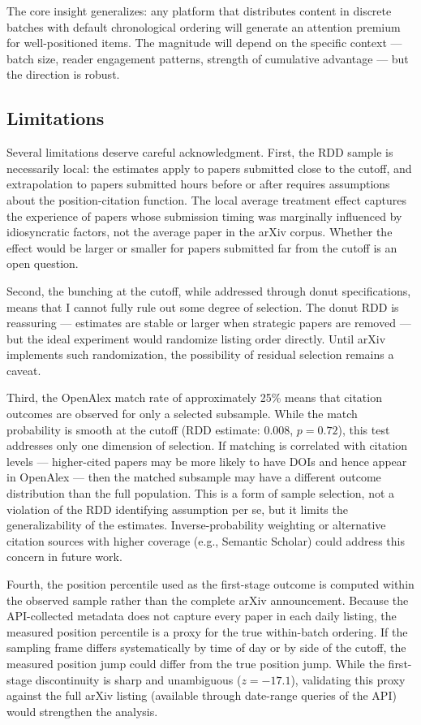 \documentclass[12pt]{article}
\begin{document}
The core insight generalizes: any platform that distributes content in discrete batches with default chronological ordering will generate an attention premium for well-positioned items. The magnitude will depend on the specific context --- batch size, reader engagement patterns, strength of cumulative advantage --- but the direction is robust.

\subsection{Limitations}

Several limitations deserve careful acknowledgment. First, the RDD sample is necessarily local: the estimates apply to papers submitted close to the cutoff, and extrapolation to papers submitted hours before or after requires assumptions about the position-citation function. The local average treatment effect captures the experience of papers whose submission timing was marginally influenced by idiosyncratic factors, not the average paper in the arXiv corpus. Whether the effect would be larger or smaller for papers submitted far from the cutoff is an open question.

Second, the bunching at the cutoff, while addressed through donut specifications, means that I cannot fully rule out some degree of selection. The donut RDD is reassuring --- estimates are stable or larger when strategic papers are removed --- but the ideal experiment would randomize listing order directly. Until arXiv implements such randomization, the possibility of residual selection remains a caveat.

Third, the OpenAlex match rate of approximately 25\% means that citation outcomes are observed for only a selected subsample. While the match probability is smooth at the cutoff (RDD estimate: 0.008, $p = 0.72$), this test addresses only one dimension of selection. If matching is correlated with citation levels --- higher-cited papers may be more likely to have DOIs and hence appear in OpenAlex --- then the matched subsample may have a different outcome distribution than the full population. This is a form of sample selection, not a violation of the RDD identifying assumption per se, but it limits the generalizability of the estimates. Inverse-probability weighting or alternative citation sources with higher coverage (e.g., Semantic Scholar) could address this concern in future work.

Fourth, the position percentile used as the first-stage outcome is computed within the observed sample rather than the complete arXiv announcement. Because the API-collected metadata does not capture every paper in each daily listing, the measured position percentile is a proxy for the true within-batch ordering. If the sampling frame differs systematically by time of day or by side of the cutoff, the measured position jump could differ from the true position jump. While the first-stage discontinuity is sharp and unambiguous ($z = -17.1$), validating this proxy against the full arXiv listing (available through date-range queries of the API) would strengthen the analysis.
\end{document}
